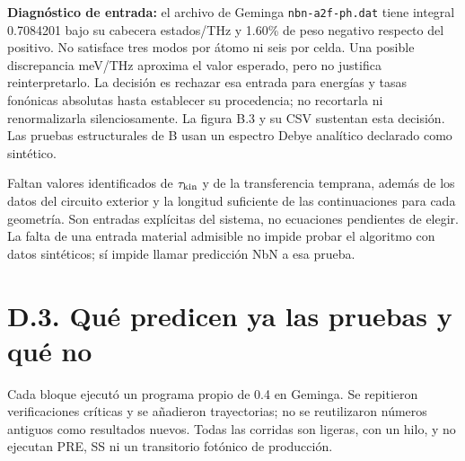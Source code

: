 \documentclass[
  spanish,
  10pt,
  a4paper,
]{article}
\begin{document}
\textbf{Diagnóstico de entrada:} el archivo de Geminga
\nolinkurl{nbn-a2f-ph.dat} tiene integral 0.7084201 bajo su cabecera
estados/THz y 1.60\% de peso negativo respecto del positivo. No
satisface tres modos por átomo ni seis por celda. Una posible
discrepancia meV/THz aproxima el valor esperado, pero no justifica
reinterpretarlo. La decisión es rechazar esa entrada para energías y
tasas fonónicas absolutas hasta establecer su procedencia; no recortarla
ni renormalizarla silenciosamente. La figura B.3 y su CSV sustentan esta
decisión. Las pruebas estructurales de B usan un espectro Debye
analítico declarado como sintético.

Faltan valores identificados de \(\tau_{\rm kin}\) y de la transferencia
temprana, además de los datos del circuito exterior y la longitud
suficiente de las continuaciones para cada geometría. Son entradas
explícitas del sistema, no ecuaciones pendientes de elegir. La falta de
una entrada material admisible no impide probar el algoritmo con datos
sintéticos; sí impide llamar predicción NbN a esa prueba.

\section{D.3. Qué predicen ya las pruebas y qué
no}\label{d.3.-quuxe9-predicen-ya-las-pruebas-y-quuxe9-no}

Cada bloque ejecutó un programa propio de 0.4 en Geminga. Se repitieron
verificaciones críticas y se añadieron trayectorias; no se reutilizaron
números antiguos como resultados nuevos. Todas las corridas son ligeras,
con un hilo, y no ejecutan PRE, SS ni un transitorio fotónico de
producción.
\end{document}
